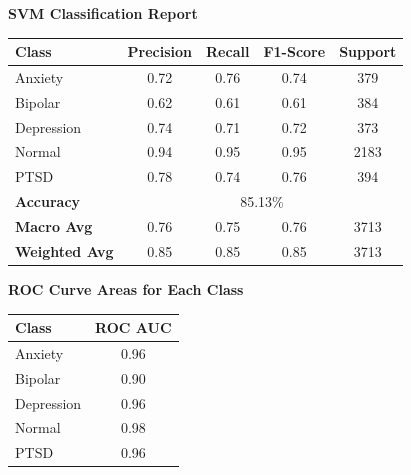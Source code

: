 \begin{center}
    \textbf{SVM Classification Report} \\[0.5em]
    \begin{tabular}{|l|c|c|c|c|}
        \hline
        \textbf{Class} & \textbf{Precision} & \textbf{Recall} & \textbf{F1-Score} & \textbf{Support} \\ \hline
        Anxiety        & 0.72               & 0.76            & 0.74              & 379              \\ \hline
        Bipolar        & 0.62               & 0.61            & 0.61              & 384              \\ \hline
        Depression     & 0.74               & 0.71            & 0.72              & 373              \\ \hline
        Normal         & 0.94               & 0.95            & 0.95              & 2183             \\ \hline
        PTSD           & 0.78               & 0.74            & 0.76              & 394              \\ \hline
        \textbf{Accuracy} & \multicolumn{4}{|c|}{85.13\%} \\ \hline
        \textbf{Macro Avg} & 0.76            & 0.75            & 0.76              & 3713             \\ \hline
        \textbf{Weighted Avg} & 0.85         & 0.85            & 0.85              & 3713             \\ \hline
    \end{tabular}
\end{center}

\vspace{0.25em}

\begin{center}
    \textbf{ROC Curve Areas for Each Class} \\[0.5em]
    \begin{tabular}{|l|c|}
        \hline
        \textbf{Class}  & \textbf{ROC AUC} \\ \hline
        Anxiety         & 0.96            \\ \hline
        Bipolar         & 0.90            \\ \hline
        Depression      & 0.96            \\ \hline
        Normal          & 0.98            \\ \hline
        PTSD            & 0.96            \\ \hline
    \end{tabular}
\end{center}

